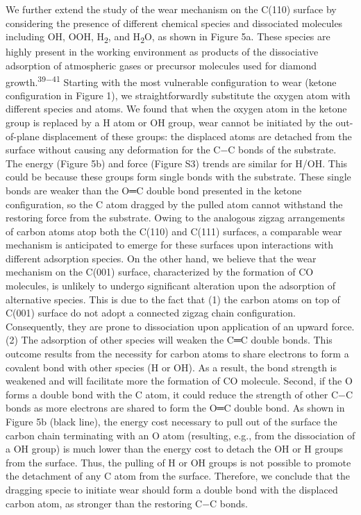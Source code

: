 \documentclass{article}
\begin{document}
We further extend the study of the wear mechanism on the C(110) surface by considering the presence of different chemical species and dissociated molecules including OH, OOH, H\textsubscript{2}, and H\textsubscript{2}O, as shown in Figure 5a. These species are highly present in the working environment as products of the dissociative adsorption of atmospheric gases or precursor molecules used for diamond growth.\textsuperscript{39−41} Starting with the most vulnerable configuration to wear (ketone configuration in Figure 1), we straightforwardly substitute the oxygen atom with different species and atoms. We found that when the oxygen atom in the ketone group is replaced by a H atom or OH group, wear cannot be initiated by the out-of-plane displacement of these groups: the displaced atoms are detached from the surface without causing any deformation for the C−C bonds of the substrate. The energy (Figure 5b) and force (Figure S3) trends are similar for H/OH. This could be because these groups form single bonds with the substrate. These single bonds are weaker than the O═C double bond presented in the ketone configuration, so the C atom dragged by the pulled atom cannot withstand the restoring force from the substrate. Owing to the analogous zigzag arrangements of carbon atoms atop both the C(110) and C(111) surfaces, a comparable wear mechanism is anticipated to emerge for these surfaces upon interactions with different adsorption species. On the other hand, we believe that the wear mechanism on the C(001) surface, characterized by the formation of CO molecules, is unlikely to undergo significant alteration upon the adsorption of alternative species. This is due to the fact that (1) the carbon atoms on top of C(001) surface do not adopt a connected zigzag chain configuration. Consequently, they are prone to dissociation upon application of an upward force. (2) The adsorption of other species will weaken the C═C double bonds. This outcome results from the necessity for carbon atoms to share electrons to form a covalent bond with other species (H or OH). As a result, the bond strength is weakened and will facilitate more the formation of CO molecule. Second, if the O forms a double bond with the C atom, it could reduce the strength of other C−C bonds as more electrons are shared to form the O═C double bond. As shown in Figure 5b (black line), the energy cost necessary to pull out of the surface the carbon chain terminating with an O atom (resulting, e.g., from the dissociation of a OH group) is much lower than the energy cost to detach the OH or H groups from the surface. Thus, the pulling of H or OH groups is not possible to promote the detachment of any C atom from the surface. Therefore, we conclude that the dragging specie to initiate wear should form a double bond with the displaced carbon atom, as stronger than the restoring C−C bonds.
\end{document}
